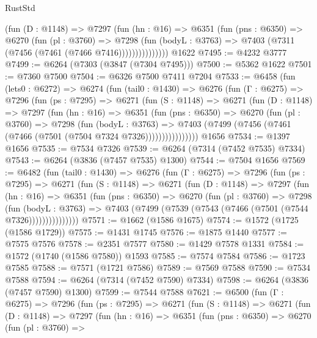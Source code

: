 \begin{lexlean}{RustStd}
\begin{coremodule}
                (fun (D : @1148) =>
                @7297
                  (fun (hn : @16) =>
                  @6351
                    (fun (pns : @6350) =>
                    @6270
                      (fun (pl : @3760) =>
                      @7298
                        (fun (bodyL : @3763) =>
                        @7403 (@7311 (@7456 (@7461 (@7466 @7416)))))))))))))))
    @1622
@7495 := @4232 @3777
@7499 := @6264 (@7303 (@3847 (@7304 @7495)))
@7500 := @5362 @1622
@7501 := @7360 @7500
@7504 := @6326 @7500 @7411 @7204
@7533 := @6458
    (fun (lets0 : @6272) =>
    @6274
      (fun (tail0 : @1430) =>
      @6276
        (fun (Γ : @6275) =>
        @7296
          (fun (ps : @7295) =>
          @6271
            (fun (S : @1148) =>
            @6271
              (fun (D : @1148) =>
              @7297
                (fun (hn : @16) =>
                @6351
                  (fun (pns : @6350) =>
                  @6270
                    (fun (pl : @3760) =>
                    @7298
                      (fun (bodyL : @3763) =>
                      @7403 (@7499 (@7456 (@7461 (@7466 (@7501 (@7504 @7324 @7326))))))))))))))))
    @1656
@7534 := @1397 @1656
@7535 := @7534 @7326
@7539 := @6264 (@7314 (@7452 @7535) @7334)
@7543 := @6264 (@3836 (@7457 @7535) @1300)
@7544 := @7504 @1656
@7569 := @6482
    (fun (tail0 : @1430) =>
    @6276
      (fun (Γ : @6275) =>
      @7296
        (fun (ps : @7295) =>
        @6271
          (fun (S : @1148) =>
          @6271
            (fun (D : @1148) =>
            @7297
              (fun (hn : @16) =>
              @6351
                (fun (pns : @6350) =>
                @6270
                  (fun (pl : @3760) =>
                  @7298
                    (fun (bodyL : @3763) =>
                    @7403 (@7499 (@7539 (@7543 (@7466 (@7501 (@7544 @7326)))))))))))))))
@7571 := @1662 (@1586 @1675)
@7574 := @1572 (@1725 (@1586 @1729))
@7575 := @1431 @1745
@7576 := @1875 @1440
@7577 := @7575 @7576
@7578 := @2351 @7577
@7580 := @1429 @7578 @1331
@7584 := @1572 (@1740 (@1586 @7580)) @1593
@7585 := @7574 @7584
@7586 := @1723 @7585
@7588 := @7571 (@1721 @7586)
@7589 := @7569 @7588
@7590 := @7534 @7588
@7594 := @6264 (@7314 (@7452 @7590) @7334)
@7598 := @6264 (@3836 (@7457 @7590) @1300)
@7599 := @7544 @7588
@7621 := @6500
    (fun (Γ : @6275) =>
    @7296
      (fun (ps : @7295) =>
      @6271
        (fun (S : @1148) =>
        @6271
          (fun (D : @1148) =>
          @7297
            (fun (hn : @16) =>
            @6351
              (fun (pns : @6350) =>
              @6270
                (fun (pl : @3760) =>

\end{coremodule}
\end{lexlean}

